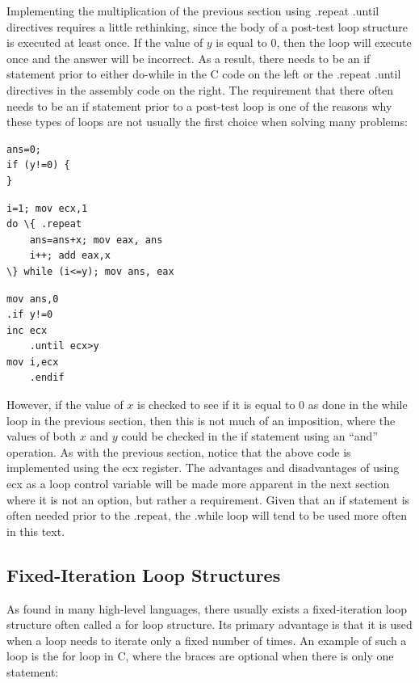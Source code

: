 \documentclass[10pt]{book}
\begin{document}
Implementing the multiplication of the previous section using .repeat .until directives requires a little rethinking, since the body of a post-test loop structure is executed at least once. If the value of $y$ is equal to 0, then the loop will execute once and the answer will be incorrect. As a result, there needs to be an if statement prior to either do-while in the C code on the left or the .repeat .until directives in the assembly code on the right. The requirement that there often needs to be an if statement prior to a post-test loop is one of the reasons why these types of loops are not usually the first choice when solving many problems:

\begin{verbatim}
ans=0;
if (y!=0) {
}
\end{verbatim}

\begin{verbatim}
i=1; mov ecx,1
do \{ .repeat
    ans=ans+x; mov eax, ans
    i++; add eax,x
\} while (i<=y); mov ans, eax
\end{verbatim}

\begin{verbatim}
mov ans,0
.if y!=0
inc ecx
    .until ecx>y
mov i,ecx
    .endif
\end{verbatim}

However, if the value of $x$ is checked to see if it is equal to 0 as done in the while loop in the previous section, then this is not much of an imposition, where the values of both $x$ and $y$ could be checked in the if statement using an ``and'' operation. As with the previous section, notice that the above code is implemented using the ecx register. The advantages and disadvantages of using ecx as a loop control variable will be made more apparent in the next section where it is not an option, but rather a requirement. Given that an if statement is often needed prior to the .repeat, the .while loop will tend to be used more often in this text.

\subsection{Fixed-Iteration Loop Structures}
As found in many high-level languages, there usually exists a fixed-iteration loop structure often called a for loop structure. Its primary advantage is that it is used when a loop needs to iterate only a fixed number of times. An example of such a loop is the for loop in C, where the braces are optional when there is only one statement:
\end{document}
